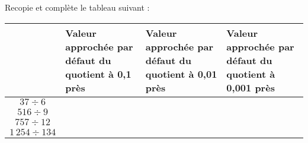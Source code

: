 Recopie et complète le tableau suivant :
\begin{center}
  \begin{tabular}{|c|m{4cm}|m{4cm}|m{4cm}|}
    \cline{2-4}
    \multicolumn{1}{c|}{}&Valeur approchée par défaut du quotient à 0,1 près&Valeur approchée par défaut du quotient à 0,01 près&Valeur approchée par défaut du quotient à 0,001 près\\
\hline
$37\div6$&&&\\
\hline
$516\div9$&&&\\
\hline
$757\div12$&&&\\
\hline
$1\,254\div134$&&&\\
\hline
  \end{tabular}
\end{center}